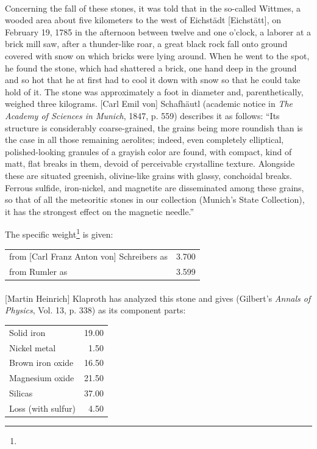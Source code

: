 \documentclass[a4paper, 12pt, oneside]{article}
\begin{document}
\paragraph*{}
Concerning the fall of these stones, it was told that in the so-called Wittmes, a wooded area about five kilometers to the west of Eichstädt [Eichstätt], on February 19, 1785 in the afternoon between twelve and one o'clock, a laborer at a brick mill saw, after a thunder-like roar, a great black rock fall onto ground covered with snow on which bricks were lying around. When he went to the spot, he found the stone, which had shattered a brick, one hand deep in the ground and so hot that he at first had to cool it down with snow so that he could take hold of it. The stone was approximately a foot in diameter and, parenthetically, weighed three kilograms. [Carl Emil von] Schafhäutl (academic notice in \emph{The Academy of Sciences in Munich}, 1847, p. 559) describes it as follows: ``Its structure is considerably coarse-grained, the grains being more roundish than is the case in all those remaining aerolites; indeed, even completely elliptical, polished-looking granules of a grayish color are found, with compact, kind of matt, flat breaks in them, devoid of perceivable crystalline texture. Alongside these are situated greenish, olivine-like grains with glassy, conchoidal breaks. Ferrous sulfide, iron-nickel, and magnetite are disseminated among these grains, so that of all the meteoritic stones in our collection (Munich's State Collection), it has the strongest effect on the magnetic needle.''

The specific weight\footnote{} is given:
\begin{center}
    \begin{tabular}{l r}
        from [Carl Franz Anton von] Schreibers as & 3.700\\
        from Rumler as & 3.599\\
    \end{tabular}
\end{center}
\paragraph*{}
[Martin Heinrich] Klaproth has analyzed this stone and gives (Gilbert's \emph{Annals of Physics}, Vol. 13, p. 338) as its component parts:
\begin{center}
    \begin{tabular}{l r}
        Solid iron & 19.00\\
        Nickel metal & 1.50\\
        Brown iron oxide & 16.50\\
        Magnesium oxide & 21.50\\
        Silicas & 37.00\\
        Loss (with sulfur) & 4.50\\
    \end{tabular}
\end{center}
\end{document}
